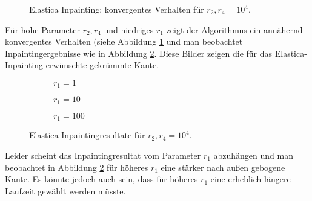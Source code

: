 \documentclass{mythesis}
\begin{document}
\begin{figure}[ht]
    \centering
    \caption{Elastica Inpainting: konvergentes Verhalten für $r_2, r_4 = 10^4$.}
    \label{fig:num_eeparam_conv}
\end{figure}

Für hohe Parameter $r_2, r_4$ und niedriges $r_1$ zeigt der Algorithmus ein annähernd konvergentes Verhalten (siehe Abbildung \ref{fig:num_eeparam_conv} und man beobachtet Inpaintingergebnisse wie in Abbildung \ref{fig:num_eeparam_png}.
Diese Bilder zeigen die für das Elastica-Inpainting erwünschte gekrümmte Kante.

\begin{figure}[ht]
    \centering
    \begin{subfigure}{0.25\textwidth}
	\centering
	\caption{$r_1 = 1$}
    \end{subfigure}%
    \begin{subfigure}{0.25\textwidth}
	\centering
	\caption{$r_1 = 10$}
    \end{subfigure}%
    \begin{subfigure}{0.25\textwidth}
	\centering
	\caption{$r_1 = 100$}
    \end{subfigure}%
    \caption{Elastica Inpaintingresultate für $r_2, r_4 = 10^4$.}
    \label{fig:num_eeparam_png}
\end{figure}

Leider scheint das Inpaintingresultat vom Parameter $r_1$ abzuhängen und man beobachtet in Abbildung \ref{fig:num_eeparam_png} für höheres $r_1$ eine stärker nach außen gebogene Kante.
Es könnte jedoch auch sein, dass für höheres $r_1$ eine erheblich längere Laufzeit gewählt werden müsste.
\end{document}
